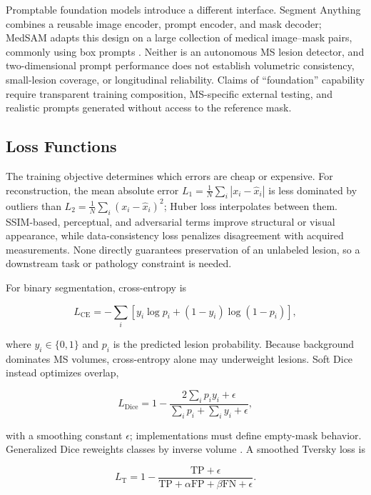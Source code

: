 \documentclass[journal,twoside,web]{ieeecolor}
\begin{document}
Promptable foundation models introduce a different interface. Segment Anything combines a reusable image encoder, prompt encoder, and mask decoder; MedSAM adapts this design on a large collection of medical image--mask pairs, commonly using box prompts \cite{sam,medsam}. Neither is an autonomous MS lesion detector, and two-dimensional prompt performance does not establish volumetric consistency, small-lesion coverage, or longitudinal reliability. Claims of ``foundation'' capability require transparent training composition, MS-specific external testing, and realistic prompts generated without access to the reference mask.


\subsection{Loss Functions}\label{subsec:loss-functions}

The training objective determines which errors are cheap or expensive. For reconstruction, the mean absolute error $L_1=\frac{1}{N}\sum_i|x_i-\hat{x}_i|$ is less dominated by outliers than $L_2=\frac{1}{N}\sum_i(x_i-\hat{x}_i)^2$; Huber loss interpolates between them. SSIM-based, perceptual, and adversarial terms improve structural or visual appearance, while data-consistency loss penalizes disagreement with acquired measurements. None directly guarantees preservation of an unlabeled lesion, so a downstream task or pathology constraint is needed.


For binary segmentation, cross-entropy is


\begin{equation}
L_{\mathrm{CE}}=-\sum_i\left[y_i\log p_i+(1-y_i)\log(1-p_i)\right],
\label{eq:ce}
\end{equation}

where $y_i\in\{0,1\}$ and $p_i$ is the predicted lesion probability. Because background dominates MS volumes, cross-entropy alone may underweight lesions. Soft Dice instead optimizes overlap,


\begin{equation}
L_{\mathrm{Dice}}=1-\frac{2\sum_i p_i y_i+\epsilon}{\sum_i p_i+\sum_i y_i+\epsilon},
\label{eq:dice}
\end{equation}

with a smoothing constant $\epsilon$; implementations must define empty-mask behavior. Generalized Dice reweights classes by inverse volume \cite{gdl}. A smoothed Tversky loss is


\begin{equation}
L_{\mathrm{T}}=1-\frac{\mathrm{TP}+\epsilon}{\mathrm{TP}+\alpha\mathrm{FP}+\beta\mathrm{FN}+\epsilon}.
\label{eq:tversky}
\end{equation}
\end{document}
